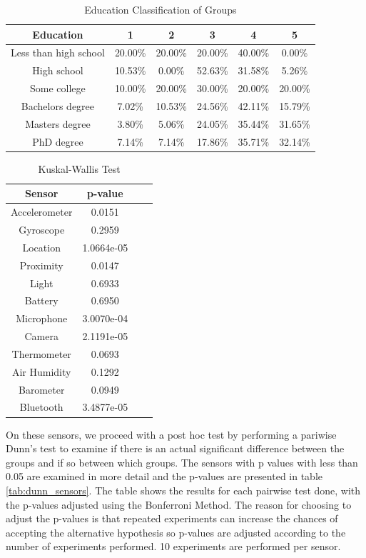 \begin{table}[h!]
  \centering
  \caption{Education Classification of Groups}
  \label{tab:edu_sensors}
  \begin{tabular}{cccccc}
    \toprule
     Education&1&2&3&4&5\\
    \midrule
    
Less than high school&20.00\%&20.00\%&20.00\%&40.00\%&0.00\%\\
High school&10.53\%&0.00\%&52.63\%&31.58\%&5.26\%\\
Some college&10.00\%&20.00\%&30.00\%&20.00\%&20.00\%\\
Bachelors degree&7.02\%&10.53\%&24.56\%&42.11\%&15.79\%\\
Masters degree&3.80\%&5.06\%&24.05\%&35.44\%&31.65\%\\
PhD degree&7.14\%&7.14\%&17.86\%&35.71\%&32.14\%\\
    \bottomrule
  \end{tabular}
\end{table}  




\begin{table}[h!]
  \centering
  \caption{Kuskal-Wallis Test}
  \label{tab:kw_sensors}
  \begin{tabular}{cccc}
    \toprule
     Sensor & p-value \\
    \midrule
    Accelerometer & 0.0151 \\
    Gyroscope & 0.2959\\
    Location & 1.0664e-05\\
    Proximity & 0.0147\\ 
    Light & 0.6933\\
    Battery & 0.6950\\ 
    Microphone & 3.0070e-04\\
    Camera & 2.1191e-05\\
    Thermometer & 0.0693\\ 
    Air Humidity & 0.1292\\
    Barometer & 0.0949\\
    Bluetooth & 3.4877e-05\\ 
    \bottomrule
  \end{tabular}
\end{table} 

On these sensors, we proceed with a post hoc test by performing a pariwise Dunn's test to examine if there is an actual significant difference between the groups and if so between which groups. The sensors with p values with less than 0.05 are examined in more detail and the p-values are presented in table \ref{tab:dunn_sensors}. The table shows the results for each pairwise test done, with the p-values adjusted using the Bonferroni Method. The reason for choosing to adjust the p-values is that repeated experiments can increase the chances of accepting the alternative hypothesis so p-values are adjusted according to the number of experiments performed. 10 experiments are performed per sensor.

